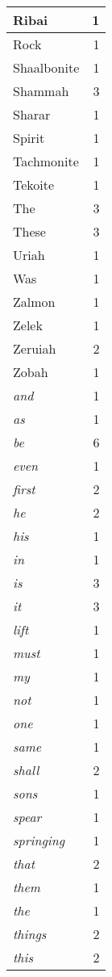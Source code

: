 \begin{center}
\begin{longtable}{l|r}
Ribai & 1 \\ \hline
Rock & 1 \\ \hline
Shaalbonite & 1 \\ \hline
Shammah & 3 \\ \hline
Sharar & 1 \\ \hline
Spirit & 1 \\ \hline
Tachmonite & 1 \\ \hline
Tekoite & 1 \\ \hline
The & 3 \\ \hline
These & 3 \\ \hline
Uriah & 1 \\ \hline
Was & 1 \\ \hline
Zalmon & 1 \\ \hline
Zelek & 1 \\ \hline
Zeruiah & 2 \\ \hline
Zobah & 1 \\ \hline
\emph{and} & 1 \\ \hline
\emph{as} & 1 \\ \hline
\emph{be} & 6 \\ \hline
\emph{even} & 1 \\ \hline
\emph{first} & 2 \\ \hline
\emph{he} & 2 \\ \hline
\emph{his} & 1 \\ \hline
\emph{in} & 1 \\ \hline
\emph{is} & 3 \\ \hline
\emph{it} & 3 \\ \hline
\emph{lift} & 1 \\ \hline
\emph{must} & 1 \\ \hline
\emph{my} & 1 \\ \hline
\emph{not} & 1 \\ \hline
\emph{one} & 1 \\ \hline
\emph{same} & 1 \\ \hline
\emph{shall} & 2 \\ \hline
\emph{sons} & 1 \\ \hline
\emph{spear} & 1 \\ \hline
\emph{springing} & 1 \\ \hline
\emph{that} & 2 \\ \hline
\emph{them} & 1 \\ \hline
\emph{the} & 1 \\ \hline
\emph{things} & 2 \\ \hline
\emph{this} & 2 \\ \hline

\end{longtable}
\end{center}

